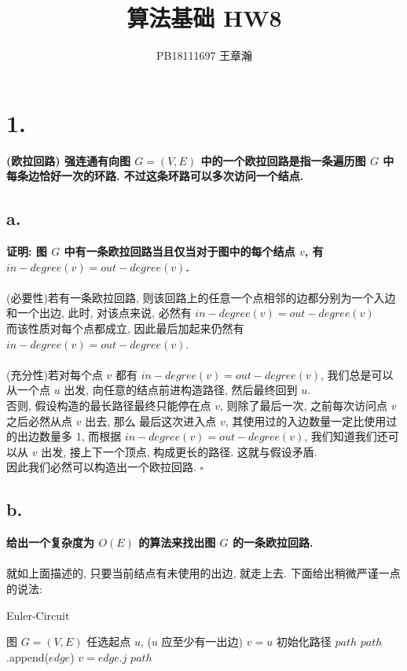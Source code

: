 \documentclass[UTF8]{article}
\title{算法基础 HW8}
\author{PB18111697 王章瀚}
\newcommand{\jumpLine} {\hspace*{\fill} \\}
\begin{document}
\maketitle
\section*{1.}
\noindent \textbf{(欧拉回路) 强连通有向图 $G=(V,E)$ 中的一个欧拉回路是指一条遍历图 $G$ 中每条边恰好一次的环路. 不过这条环路可以多次访问一个结点.}
\subsection*{a.}
\noindent \textbf{证明: 图 $G$ 中有一条欧拉回路当且仅当对于图中的每个结点 $v$, 有 $in-degree(v)=out-degree(v)$.}\\
\jumpLine
(必要性)若有一条欧拉回路, 则该回路上的任意一个点相邻的边都分别为一个入边和一个出边, 此时, 对该点来说, 必然有 $in-degree(v)=out-degree(v)$\\
而该性质对每个点都成立, 因此最后加起来仍然有 $in-degree(v)=out-degree(v)$.\\
\jumpLine
(充分性)若对每个点 $v$ 都有 $in-degree(v)=out-degree(v)$, 我们总是可以从一个点 $u$ 出发, 向任意的结点前进构造路径, 然后最终回到 $u$.\\
否则, 假设构造的最长路径最终只能停在点 $v$, 则除了最后一次, 之前每次访问点 $v$ 之后必然从点 $v$ 出去, 那么 最后这次进入点 $v$, 其使用过的入边数量一定比使用过的出边数量多 1, 而根据 $in-degree(v)=out-degree(v)$, 我们知道我们还可以从 $v$ 出发, 接上下一个顶点, 构成更长的路径. 这就与假设矛盾.\\
因此我们必然可以构造出一个欧拉回路.
\hfill$\square$
\subsection*{b.}
\noindent \textbf{给出一个复杂度为 $O(E)$ 的算法来找出图 $G$ 的一条欧拉回路.}\\
\jumpLine
就如上面描述的, 只要当前结点有未使用的出边, 就走上去. 下面给出稍微严谨一点的说法:

\begin{algorithm}[H]
	\caption{{\sc Euler-Circuit}}
	\begin{algorithmic}[1] %
		\Require 图 $G=(V,E)$
		\State 任选起点 $u$, ($u$ 应至少有一出边)
		\State $v=u$
		\State 初始化路径 $path$
		 
			\State $path$.append($edge$)
			\State $v = edge.j$ 
		\EndWhile
		\State \Return $path$
		\EndFunction
	\end{algorithmic}
\end{algorithm}
\end{document}
